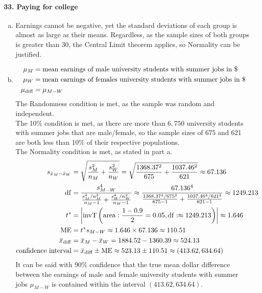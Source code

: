 \documentclass[../Homework]{subfiles}
\begin{document}
			\paragraph{33. Paying for college}
				\begin{enumerate}[a.]
					\item
						Earnings cannot be negative, yet the standard deviations of each group is almost as large as their means. Regardless, as the sample sizes of both groups is greater than 30, the Central Limit theorem applies, so Normality can be justified.
					\item
						\begin{align*}
							\mu_M &= \text{mean earnings of male university students with summer jobs in \$} \\
							\mu_W &= \text{mean earnings of females university students with summer jobs in \$} \\
							\mu_{\mathrm{diff}} &= \mu_{M - W}
						\end{align*}
						The Randomness condition is met, as the sample was random and independent. \\
						The 10\% condition is met, as there are more than $6,750$ university students with summer jobs that are male/female, so the sample sizes of 675 and 621 are both less than 10\% of their respective populations. \\
						The Normality condition is met, as stated in part a. \\
						\begin{align*}
							s_{\bar{x}_M - \bar{x}_W} &= \sqrt{\frac{s_M^2}{n_M} + \frac{s_W^2}{n_W}} = \sqrt{\frac{1368.37^2}{675} + \frac{1037.46^2}{621}} \approx 67.136 \\
							\operatorname{df} &= \frac{s_{M - W}^4}{\frac{s_M^4/n_M^2}{n_M - 1} + \frac{s_W^4/n_W^2}{n_W - 1}} \approx \frac{67.136^4}{\frac{1368.37^4/675^2}{675 - 1} + \frac{1037.46^4/621^2}{621 - 1}} \approx 1249.213 \\
							t^* &= \left|\operatorname{invT}\left(\operatorname{area}: \frac{1 - 0.9}{2} = 0.05, \operatorname{df}: \approx 1249.213\right)\right| \approx 1.646 \\
							\operatorname{ME} &= t^*s_{M - W} \approx 1.646 \times 67.136 \approx 110.51 \\
							\bar{x}_{\mathrm{diff}} &= \bar{x}_M - \bar{x}_W = 1884.52 - 1360.39 \approx 524.13 \\
							\text{confidence interval} &= \bar{x}_{\mathrm{diff}} \pm \operatorname{ME} \approx 523.13 \pm 110.51 \approx (413.62, 634.64)
						\end{align*}
						It can be said with 90\% confidence that the true mean dollar difference between the earnings of male and female university students with summer jobs $\mu_{M - W}$ is contained within the interval $(413.62, 634.64)$.
				\end{enumerate}
\end{document}
